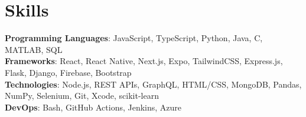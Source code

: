 

\section*{Skills}
	\textbf{Programming Languages}{: JavaScript, TypeScript, Python, Java, C, MATLAB, SQL} \\
	\textbf{Frameworks}{: React, React Native, Next.js, Expo, TailwindCSS, Express.js, Flask, Django, Firebase, Bootstrap} \\
	\textbf{Technologies}{: Node.js, REST APIs, GraphQL,  HTML/CSS, MongoDB, Pandas, NumPy, Selenium, Git, Xcode, scikit-learn} \\
	\textbf{DevOps}{: Bash, GitHub Actions, Jenkins, Azure} \\
\vspace{-6.5pt}